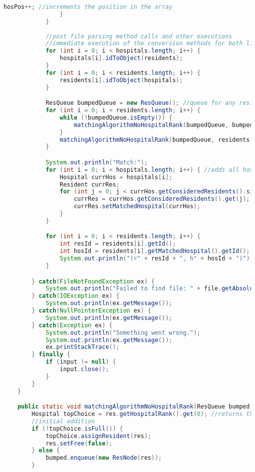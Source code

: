 \documentclass[letterpaper, 10pt,DIV=13]{scrartcl}
\numberwithin{equation}{section} %
\numberwithin{figure}{section} %
\numberwithin{table}{section} %
\begin{document}
\begin{lstlisting}[frame=single, language=java, breaklines]
                    hosPos++; //increments the position in the array
                }   
            }
            
            //post file parsing method calls and other executions
            //immediate execution of the conversion methods for both lists
            for (int i = 0; i < hospitals.length; i++) {
                hospitals[i].idToObject(residents);
            }
            for (int i = 0; i < residents.length; i++) {
                residents[i].idToObject(hospitals);
            }

            ResQueue bumpedQueue = new ResQueue(); //queue for any residents that get bumped from a hospital
            for (int i = 0; i < residents.length; i++) {
                while (!bumpedQueue.isEmpty()) {
                    matchingAlgorithmNoHospitalRank(bumpedQueue, bumpedQueue.dequeue().getMyRes(), residents);
                }
                matchingAlgorithmNoHospitalRank(bumpedQueue, residents[i], residents);
            }

            System.out.println("Match:");
            for (int i = 0; i < hospitals.length; i++) { //adds all hospitals to their resident's matchedHospital member
                Hospital currHos = hospitals[i];
                Resident currRes;
                for (int j = 0; j < currHos.getConsideredResidents().size(); j++) {
                    currRes = currHos.getConsideredResidents().get(j);
                    currRes.setMatchedHospital(currHos);
                }
            }

            for (int i = 0; i < residents.length; i++) {
                int resId = residents[i].getId();
                int hosId = residents[i].getMatchedHospital().getId();
                System.out.println("(r" + resId + ", h" + hosId + ")");
            }

        } catch(FileNotFoundException ex) {
            System.out.println("Failed to find file: " + file.getAbsolutePath());
        } catch(IOException ex) {
            System.out.println(ex.getMessage());
        } catch(NullPointerException ex) {
            System.out.println(ex.getMessage());
        } catch(Exception ex) {
            System.out.println("Something went wrong.");
            System.out.println(ex.getMessage());
            ex.printStackTrace();
        } finally {
            if (input != null) {
                input.close();
            }
        }
    }

    public static void matchingAlgorithmNoHospitalRank(ResQueue bumped, Resident res, Resident[] residents) {
        Hospital topChoice = res.getHospitalRank().get(0); //returns the current top available choice of the resident
        //initial addition
        if (!topChoice.isFull()) {
            topChoice.assignResident(res);
            res.setFree(false);
        } else {
            bumped.enqueue(new ResNode(res));
        }


\end{lstlisting}
\end{document}
